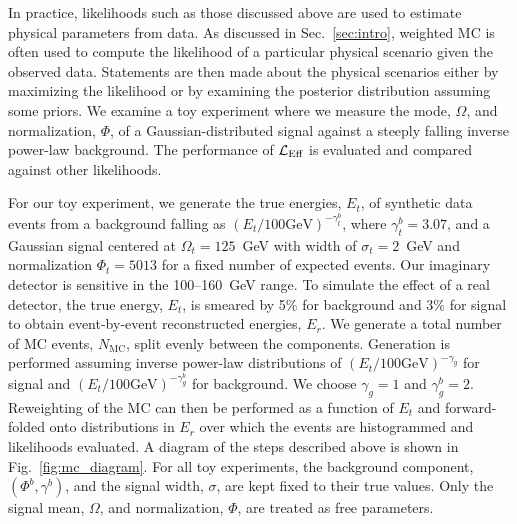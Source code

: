 In practice, likelihoods such as those discussed above are used to estimate physical parameters from data. As discussed in Sec.~\ref{sec:intro}, weighted MC is often used to compute the likelihood of a particular physical scenario given the observed data. Statements are then made about the physical scenarios either by maximizing the likelihood or by examining the posterior distribution assuming some priors. We examine a toy experiment where we measure the mode, $\Omega$, and normalization, $\Phi$, of a Gaussian-distributed signal against a steeply falling inverse power-law background. The performance of $\mathcal{L}_\textmd{Eff}$ is evaluated and compared against other likelihoods.

For our toy experiment, we generate the true energies, $E_t$, of synthetic data events from a background falling as $(E_t/100 \mathrm{GeV})^{-\gamma_t^b}$, where $\gamma_t^b=3.07$, and a Gaussian signal centered at $\Omega_t=125$~GeV with width of $\sigma_t=2$~GeV and normalization $\Phi_t=5013$ for a fixed number of expected events. Our imaginary detector is sensitive in the 100--160~GeV range. To simulate the effect of a real detector, the true energy, $E_t$, is smeared by 5\% for background and 3\% for signal to obtain event-by-event reconstructed energies, $E_r$. We generate a total number of MC events, $N_{\mathrm{MC}}$, split evenly between the components. Generation is performed assuming inverse power-law distributions of $(E_t/100 \mathrm{GeV})^{-\gamma_g}$ for signal and $(E_t/100 \mathrm{GeV})^{-\gamma_g^b}$ for background. We choose $\gamma_g=1$ and $\gamma_g^b=2$. Reweighting of the MC can then be performed as a function of $E_t$ and forward-folded onto distributions in $E_r$ over which the events are histogrammed and likelihoods evaluated. A diagram of the steps described above is shown in Fig.~\ref{fig:mc_diagram}. For all toy experiments, the background component, $(\Phi^b,\gamma^b)$, and the signal width, $\sigma$, are kept fixed to their true values. Only the signal mean, $\Omega$, and normalization, $\Phi$, are treated as free parameters.

